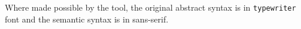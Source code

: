 \documentclass{article}
\begin{document}
Where made possible by the tool, the original abstract syntax is in \texttt{typewriter} font and the semantic syntax is in \textsf{sans-serif}.

\eject \pdfpagewidth=15in \pdfpageheight=9in



\end{document}

